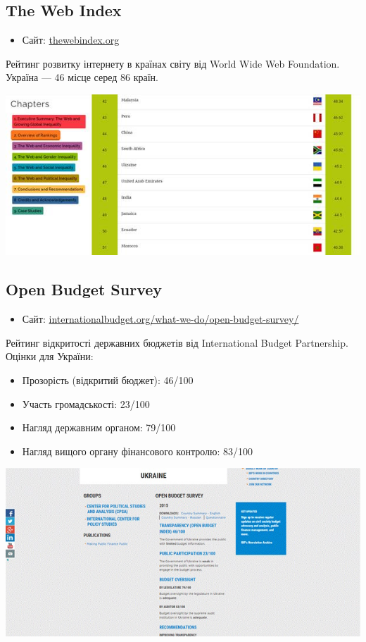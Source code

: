 \subsection{The Web Index}

\begin{itemize}
    \item Сайт: \href{http://thewebindex.org/}{thewebindex.org}
\end{itemize}

Рейтинг розвитку інтернету в країнах світу від World Wide Web Foundation. Україна — 46 місце серед 86 країн.

\includegraphics{images/014.jpg}

\subsection{Open Budget Survey}

\begin{itemize}
    \item Сайт: \href{http://internationalbudget.org/what-we-do/open-budget-survey/}{internationalbudget.org/what-we-do/open-budget-survey/}
\end{itemize}

Рейтинг відкритості державних бюджетів від International Budget Partnership. Оцінки для України:
\begin{itemize}
    \item Прозорість (відкритий бюджет): 46/100
    \item Участь громадськості: 23/100
    \item Нагляд державним органом: 79/100
    \item Нагляд вищого органу фінансового контролю: 83/100
\end{itemize}

\includegraphics{images/015.jpg}

